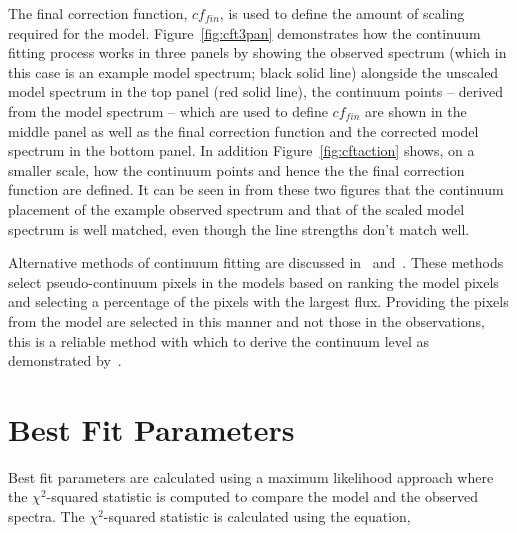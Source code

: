 The final correction function, $cf_{fin}$,
is used to define the amount of scaling required for the model.
Figure~\ref{fig:cft3pan} demonstrates how the continuum fitting process works in three panels by showing the observed spectrum (which in this case is an example model spectrum; black solid line) alongside the unscaled model spectrum in the top panel (red solid line), the continuum points -- derived from the model spectrum -- which are used to define $cf_{fin}$ are shown in the middle panel as well as the final correction function and the corrected model spectrum in the bottom panel.
In addition Figure~\ref{fig:cftaction} shows, on a smaller scale, how the continuum points and hence the the final correction function are defined.
It can be seen in from these two figures that the continuum placement of the example observed spectrum and that of the scaled model spectrum is well matched, even though the line strengths don't match well.






Alternative methods of continuum fitting are discussed in~\cite{2010MNRAS.407.1203D} and~\cite{2011A&A...527A..50E}.
These methods select pseudo-continuum pixels in the models based on ranking the model pixels and selecting a percentage of the pixels with the largest flux.
Providing the pixels from the model are selected in this manner and not those in the observations, this is a reliable method with which to derive the continuum level as demonstrated by~\cite{2015ApJ...806...21D}.

\section{Best Fit Parameters} %
\label{sec:best_fit_parameters}

Best fit parameters are calculated using a maximum likelihood approach where the $\chi^{2}$-squared statistic is computed to compare the model and the observed spectra.
The $\chi^{2}$-squared statistic is calculated using the equation,

